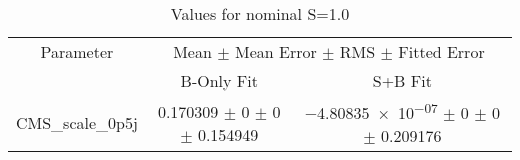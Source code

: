 \begin{table}
\centering
\caption{Values for nominal S=1.0}
\begin{tabular}{ccc}
\toprule
Parameter & \multicolumn{2}{c}{Mean $\pm$ Mean Error $\pm$ RMS $\pm$ Fitted Error}\\
 & B-Only Fit & S+B Fit\\
\midrule
CMS\_scale\_0p5j & \num{0.170309} $\pm$ \num{0} $\pm$ \num{0} $\pm$ \num{0.154949} & \num{-4.80835e-07} $\pm$ \num{0} $\pm$ \num{0} $\pm$ \num{0.209176}\\
\bottomrule
\end{tabular}
\end{table}